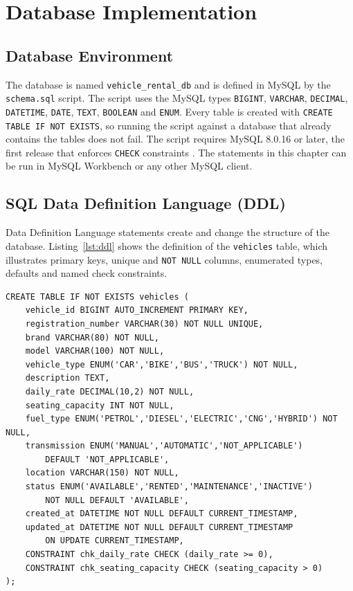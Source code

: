 \documentclass[10pt,a4paper]{report}
\newcommand{\col}[1]{\texttt{#1}}
\begin{document}
\chapter{Database Implementation}

\section{Database Environment}
The database is named \col{vehicle_rental_db} and is defined in MySQL by the \col{schema.sql} script. The script uses the MySQL types \col{BIGINT}, \col{VARCHAR}, \col{DECIMAL}, \col{DATETIME}, \col{DATE}, \col{TEXT}, \col{BOOLEAN} and \col{ENUM}. Every table is created with \col{CREATE TABLE IF NOT EXISTS}, so running the script against a database that already contains the tables does not fail. The script requires MySQL 8.0.16 or later, the first release that enforces \col{CHECK} constraints \cite{mysqlcreate}. The statements in this chapter can be run in MySQL Workbench or any other MySQL client.

\section{SQL Data Definition Language (DDL)}
Data Definition Language statements create and change the structure of the database. Listing~\ref{lst:ddl} shows the definition of the \col{vehicles} table, which illustrates primary keys, unique and \col{NOT NULL} columns, enumerated types, defaults and named check constraints.

\begin{lstlisting}[caption={DDL for the vehicles table},label={lst:ddl}]
CREATE TABLE IF NOT EXISTS vehicles (
    vehicle_id BIGINT AUTO_INCREMENT PRIMARY KEY,
    registration_number VARCHAR(30) NOT NULL UNIQUE,
    brand VARCHAR(80) NOT NULL,
    model VARCHAR(100) NOT NULL,
    vehicle_type ENUM('CAR','BIKE','BUS','TRUCK') NOT NULL,
    description TEXT,
    daily_rate DECIMAL(10,2) NOT NULL,
    seating_capacity INT NOT NULL,
    fuel_type ENUM('PETROL','DIESEL','ELECTRIC','CNG','HYBRID') NOT NULL,
    transmission ENUM('MANUAL','AUTOMATIC','NOT_APPLICABLE')
        DEFAULT 'NOT_APPLICABLE',
    location VARCHAR(150) NOT NULL,
    status ENUM('AVAILABLE','RENTED','MAINTENANCE','INACTIVE')
        NOT NULL DEFAULT 'AVAILABLE',
    created_at DATETIME NOT NULL DEFAULT CURRENT_TIMESTAMP,
    updated_at DATETIME NOT NULL DEFAULT CURRENT_TIMESTAMP
        ON UPDATE CURRENT_TIMESTAMP,
    CONSTRAINT chk_daily_rate CHECK (daily_rate >= 0),
    CONSTRAINT chk_seating_capacity CHECK (seating_capacity > 0)
);
\end{lstlisting}
\end{document}
